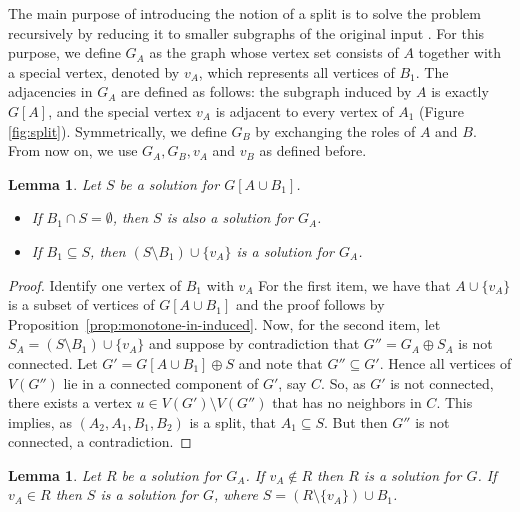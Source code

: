 \documentclass[11pt]{article}
\newtheorem{lemma}[theorem]{Lemma}
\theoremstyle{definition}
\begin{document}
The main purpose of introducing the notion of a split is to solve the problem
recursively by reducing it to smaller subgraphs of the original input \cite{Rao2008,Cicerone1999,Cunningham1982}.
For this purpose, we define $G_A$ as the graph whose vertex set consists of $A$
together with a special vertex, denoted by $v_A$, which represents all vertices of
$B_1$. The adjacencies in $G_A$ are defined as follows: the subgraph induced by
$A$ is exactly $G[A]$, and the special vertex $v_A$ is adjacent to every vertex of
$A_1$ (Figure \ref{fig:split}). Symmetrically, we define $G_B$ by exchanging the roles of $A$ and $B$.
From now on, we use $G_A,G_B, v_A$ and $v_B$ as defined before.


\begin{lemma} \label{lemma:SinAB1-SinA1}
Let $S$ be a solution for $G[A \cup B_1]$.
\begin{itemize}
 \item If $B_1 \cap S = \emptyset$, then $S$ is also a solution for $G_A$. 
 \item If $B_1 \subseteq S$, then $(S \setminus B_1) \cup \{v_A\}$ is a solution for $G_A$. 
\end{itemize}
\end{lemma}
\begin{proof}
Identify one vertex of $B_1$ with $v_A$
For the first item, we have that
$A \cup \{v_A\}$ is a subset of vertices of $G[A \cup B_1]$ and the proof follows by Proposition~\ref{prop:monotone-in-induced}.
Now, for the second item, let $S_A= (S \setminus B_1) \cup \{v_A\}$ and suppose by contradiction
that $G''= G_A \oplus S_A$ is not connected.
Let $G'=G[A \cup B_1] \oplus S$ and note that  $G'' \subseteq G'$. Hence all vertices of $V(G'')$ lie in a connected component of $G'$, say $C$. So, as $G'$ is not connected, there exists a vertex $u \in V(G') \setminus V(G'')$ that has no neighbors in $C$. This implies, as $(A_2,A_1,B_1,B_2)$ is a split, that $A_1 \subseteq S$. But then $G''$ is not connected, a contradiction.
\end{proof}

\begin{lemma}\label{lemma:Rdisconnected-thenSdisconnected}
Let $R$ be a solution for $G_A$.
If $v_A \notin R$ then $R$ is a solution for $G$.
If $v_A \in R$ then $S$ is a solution for $G$, where $S = (R \setminus \{v_A\}) \cup B_1$.
\end{lemma}
\end{document}
